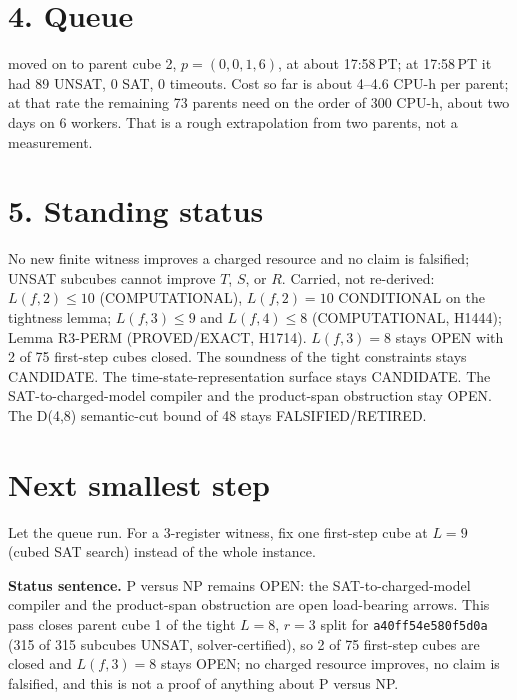 \documentclass[11pt]{article}
\begin{document}
\section*{4. Queue}
 moved on to parent cube 2, $p=(0,0,1,6)$, at about 17:58\,PT; at 17:58\,PT it had 89 UNSAT, 0 SAT, 0 timeouts. Cost so far is about 4--4.6 CPU-h per parent; at that rate the remaining 73 parents need on the order of 300 CPU-h, about two days on 6 workers. That is a rough extrapolation from two parents, not a measurement.

\section*{5. Standing status}
No new finite witness improves a charged resource and no claim is falsified; UNSAT subcubes cannot improve $T$, $S$, or $R$. Carried, not re-derived: $L(f,2)\le 10$ (COMPUTATIONAL), $L(f,2)=10$ CONDITIONAL on the tightness lemma; $L(f,3)\le 9$ and $L(f,4)\le 8$ (COMPUTATIONAL, H1444); Lemma R3-PERM (PROVED/EXACT, H1714). $L(f,3)=8$ stays OPEN with 2 of 75 first-step cubes closed. The soundness of the tight constraints stays CANDIDATE. The time-state-representation surface stays CANDIDATE. The SAT-to-charged-model compiler and the product-span obstruction stay OPEN. The D(4,8) semantic-cut bound of 48 stays FALSIFIED/RETIRED.

\section*{Next smallest step}
Let the queue run. For a 3-register witness, fix one first-step cube at $L=9$ (cubed SAT search) instead of the whole instance.

\bigskip
\noindent\textbf{Status sentence.} P versus NP remains OPEN: the SAT-to-charged-model compiler and the product-span obstruction are open load-bearing arrows. This pass closes parent cube 1 of the tight $L=8$, $r=3$ split for \texttt{a40ff54e580f5d0a} (315 of 315 subcubes UNSAT, solver-certified), so 2 of 75 first-step cubes are closed and $L(f,3)=8$ stays OPEN; no charged resource improves, no claim is falsified, and this is not a proof of anything about P versus NP.
\end{document}
